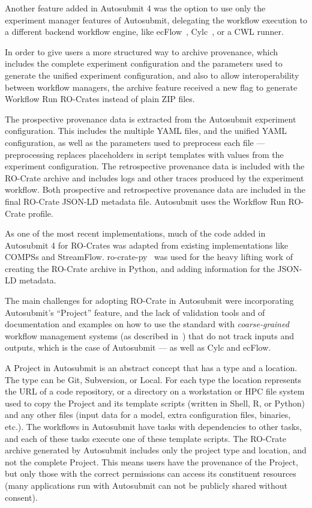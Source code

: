 Another feature added in Autosubmit 4 was the option to use only the experiment manager features of Autosubmit, delegating the workflow execution to a different backend workflow engine, like ecFlow~\cite{Bahra 2011}, Cylc~\cite{Oliver 2023}, or a CWL runner.

In order to give users a more structured way to archive provenance, which includes the complete experiment configuration and the parameters used to generate the unified experiment configuration, and also to allow interoperability between workflow managers, the archive feature received a new flag to generate Workflow Run RO-Crates instead of plain ZIP files.

The prospective provenance data is extracted from the Autosubmit experiment configuration.
This includes the multiple YAML files, and the unified YAML configuration, as well as the parameters used to preprocess each file --- preprocessing replaces placeholders in script templates with values from the experiment configuration.
The retrospective provenance data is included with the RO-Crate archive and includes logs and other traces produced by the experiment workflow.
Both prospective and retrospective provenance data are included in the final RO-Crate JSON-LD metadata file. Autosubmit uses the Workflow Run RO-Crate profile.

As one of the most recent implementations, much of the code added in Autosubmit 4 for RO-Crates was adapted from existing implementations like COMPSs and StreamFlow.
ro-crate-py~\cite{ro-crate-py} was used for the heavy lifting work of creating the RO-Crate archive in Python, and adding information for the JSON-LD metadata.

The main challenges for adopting RO-Crate in Autosubmit were incorporating Autosubmit's ``Project'' feature, and the lack of validation tools and of documentation and examples on how to use the standard with \emph{coarse-grained} workflow management systems (as described in~\cite{Goble 2020}) that do not track inputs and outputs, which is the case of Autosubmit --- as well as Cylc and ecFlow.

A Project in Autosubmit is an abstract concept that has a type and a location.
The type can be Git, Subversion, or Local.
For each type the location represents the URL of a code repository, or a directory on a workstation or HPC file system used to copy the Project and its template scripts (written in Shell, R, or Python) and any other files (input data for a model, extra configuration files, binaries, etc.).
The workflows in Autosubmit have tasks with dependencies to other tasks, and each of these tasks execute one of these template scripts.
The RO-Crate archive generated by Autosubmit includes only the project type and location, and not the complete Project.
This means users have the provenance of the Project, but only those with the correct permissions can access its constituent resources (many applications run with Autosubmit can not be publicly shared without consent).

